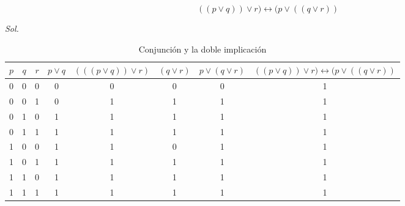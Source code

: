 \begin{problem}
\begin{equation*}
	((p \lor q))\lor r) \longleftrightarrow (p \lor  ((q \lor  r))
\end{equation*}
\end{problem}

\textit{ Sol. }
\begin{table}[h!]
	\centering
	\begin{tabular}{|c|c|c|c|c|c|c|c|}
		\hline
		{$p$} & {$q$} & {$r$} & {$p\lor q$} & {$(((p\lor q))\lor r)$} & {$(q \lor  r)$} & {$ p \lor  (q\lor  r)$} & {$((p \lor q))\lor r) \longleftrightarrow (p \lor  ((q \lor  r))$} \\ \hline
		{0}   & {0}   & {0}   & {0}         & {0}                     & {0}             & {0}                     & {1}                                                                \\ \hline

		{0}   & {0}   & {1}   & {0}         & {1}                     & {1}             & {1}                     & {1}                                                                \\ \hline

		{0}   & {1}   & {0}   & {1}         & {1}                     & {1}             & {1}                     & {1}                                                                \\ \hline

		{0}   & {1}   & {1}   & {1}         & {1}                     & {1}             & {1}                     & {1}                                                                \\ \hline

		{1}   & {0}   & {0}   & {1}         & {1}                     & {0}             & {1}                     & {1}                                                                \\ \hline

		{1}   & {0}   & {1}   & {1}         & {1}                     & {1}             & {1}                     & {1}                                                                \\ \hline

		{1}   & {1}   & {0}   & {1}         & {1}                     & {1}             & {1}                     & {1}                                                                \\ \hline

		{1}   & {1}   & {1}   & {1}         & {1}                     & {1}             & {1}                     & 1                                                                  \\ \hline
	\end{tabular}
	\caption{Conjunción y la doble implicación}
	\label{tabfmc10}
\end{table}

